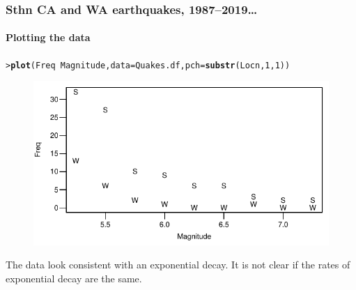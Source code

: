 \documentclass{beamer}\usepackage[]{graphicx}\usepackage[]{xcolor}
\makeatletter
\newcommand{\hlnum}[1]{\textcolor[rgb]{0.686,0.059,0.569}{#1}}%
\newcommand{\hlopt}[1]{\textcolor[rgb]{0,0,0}{#1}}%
\newcommand{\hlstd}[1]{\textcolor[rgb]{0.345,0.345,0.345}{#1}}%
\newcommand{\hlkwc}[1]{\textcolor[rgb]{0.333,0.667,0.333}{#1}}%
\newcommand{\hlkwd}[1]{\textcolor[rgb]{0.737,0.353,0.396}{\textbf{#1}}}%
\newenvironment{kframe}{%
 \def\at@end@of@kframe{}%
 \ifinner\ifhmode%
  \def\at@end@of@kframe{\end{minipage}}%
  \begin{minipage}{\columnwidth}%
 \fi\fi%
 \def\FrameCommand##1{\hskip\@totalleftmargin \hskip-\fboxsep
 \colorbox{shadecolor}{##1}\hskip-\fboxsep
     \hskip-\linewidth \hskip-\@totalleftmargin \hskip\columnwidth}%
 \MakeFramed {\advance\hsize-\width
   \@totalleftmargin\z@ \linewidth\hsize
   \@setminipage}}%
 {\par\unskip\endMakeFramed%
 \at@end@of@kframe}
\newenvironment{knitrout}{}{} %
\makeatother
\begin{document}
\begin{frame}[fragile]
\frametitle{Sthn CA and WA earthquakes, 1987--2019\ldots}
\framesubtitle{Plotting the data}
\begin{knitrout}\scriptsize
{}\color{fgcolor}\begin{kframe}
\begin{alltt}
\hlstd{> }\hlkwd{plot}\hlstd{(Freq}\hlopt{~}\hlstd{Magnitude,}\hlkwc{data}\hlstd{=Quakes.df,}\hlkwc{pch}\hlstd{=}\hlkwd{substr}\hlstd{(Locn,}\hlnum{1}\hlstd{,}\hlnum{1}\hlstd{))}
\end{alltt}
\end{kframe}
\end{knitrout}



\begin{figure}
  \centering
  \includegraphics[scale=0.8]{figure/RC-H14-003}
\end{figure}

The data look consistent with an exponential decay. It is not clear if the rates of exponential decay are the same.
\end{frame}
\end{document}
